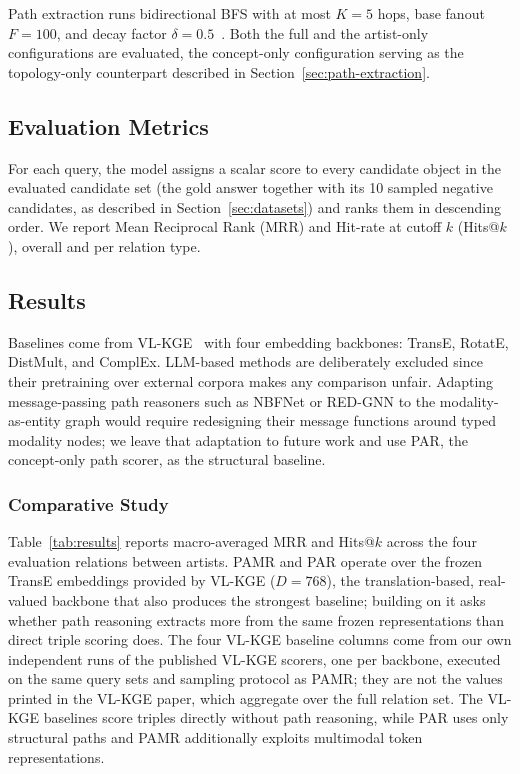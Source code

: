 \documentclass[runningheads]{llncs}
\begin{document}
Path extraction runs bidirectional BFS with at most $K = 5$ hops, base
fanout $F = 100$, and decay factor $\delta = 0.5$~\cite{icaart26}. Both
the full and the artist-only configurations are
evaluated, the concept-only configuration serving as the topology-only
counterpart described in Section~\ref{sec:path-extraction}.

\subsection{Evaluation Metrics}
\label{sec:evaluation-metrics}

For each query, the model assigns a scalar score to every candidate
object in the evaluated candidate set (the gold answer together with
its 10 sampled negative candidates, as described in
Section~\ref{sec:datasets}) and ranks them in descending order. We
report Mean Reciprocal Rank (MRR) and Hit-rate at cutoff $k$
(Hits@$k$), overall and per relation type.

\subsection{Results}
\label{sec:results}

Baselines come from VL-KGE~\cite{efthymiou2026vlkge} with four embedding
backbones: TransE, RotatE, DistMult, and ComplEx. LLM-based methods are
deliberately excluded since their pretraining over external corpora makes
any comparison unfair. Adapting message-passing path reasoners such as
NBFNet or RED-GNN to the modality-as-entity graph would require
redesigning their message functions around typed modality nodes; we leave
that adaptation to future work and use PAR, the concept-only path scorer,
as the structural baseline.

\subsubsection{Comparative Study}

Table~\ref{tab:results} reports macro-averaged MRR and Hits@$k$ across
the four evaluation relations between artists. PAMR and PAR operate over
the frozen TransE embeddings provided by VL-KGE ($D = 768$), the
translation-based, real-valued backbone that also produces the strongest
baseline; building on it asks whether path reasoning extracts more from
the same frozen representations than direct triple scoring does. The four
VL-KGE baseline columns come from
our own independent runs of the published VL-KGE scorers, one per
backbone, executed on the same query sets and sampling protocol as PAMR;
they are not the values printed in the VL-KGE paper, which aggregate over
the full relation set. The VL-KGE baselines score triples directly
without path reasoning, while PAR uses only structural paths and PAMR
additionally exploits multimodal token representations.
\end{document}
